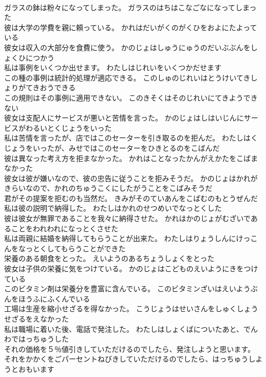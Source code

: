 \documentclass[8pt]{extreport}
\begin{document}
\begin{CJK}{UTF8}{min}
\\	ガラスの鉢は粉々になってしまった。	ガラスのはちはこなごなになってしまった 
\\	彼は大学の学費を親に頼っている。	かれはだいがくのがくひをおよにたよっている 
\\	彼女は収入の大部分を食費に使う。	かのじょはしゅうにゅうのだいぶぶんをしょくひにつかう 
\\	私は事例をいくつか出せます。	わたしはじれいをいくつかだせます 
\\	この種の事例は統計的処理が適応できる。	このしゅのじれいはとうけいてきしょりがてきおうできる 
\\	この規則はその事例に適用できない。	このきそくはそのじれいにてきようできない 
\\	彼女は支配人にサービスが悪いと苦情を言った。	かのじょはしはいじんにサービスがわるいとくじょうをいった 
\\	私は苦情を言ったが、店ではこのセーターを引き取るのを拒んだ。	わたしはくじょうをいったが、みせではこのセーターをひきとるのをこばんだ 
\\	彼は異なった考え方を拒まなかった。	かれはことなったかんがえかたをこばまなかった 
\\	彼女は彼が嫌いなので、彼の忠告に従うことを拒みそうだ。	かのじょはかれがきらいなので、かれのちゅうこくにしたがうことをこばみそうだ 
\\	君がその提案を拒むのも当然だ。	きみがそのていあんをこばむのもとうぜんだ 
\\	私は彼の説明で納得した。	わたしはかれのせつめいでなっとくした 
\\	彼は彼女が無罪であることを我々に納得させた。	かれはかのじょがむざいであることをわれわれになっとくさせた 
\\	私は両親に結婚を納得してもらうことが出来た。	わたしはりょうしんにけっこんをなっとくしてもらうことができた 
\\	栄養のある朝食をとった。	えいようのあるちょうしょくをとった 
\\	彼女は子供の栄養に気をつけている。	かのじょはこどものえいようにきをつけている 
\\	このビタミン剤は栄養分を豊富に含んでいる。	このビタミンざいはえいようぶんをほうふにふくんでいる 
\\	工場は生産を縮小せざるを得なかった。	こうじょうはせいさんをしゅくしょうせざるをえなかった 
\\	私は職場に着いた後、電話で発注した。	わたしはしょくばについたあと、でんわではっちゅうした 
\\	それの価格を５％値引きしていただけるのでしたら、発注しようと思います。	それをかかくをごパーセントねびきしていただけるのでしたら、はっちゅうしようとおもいます 

\end{CJK}
\end{document}
